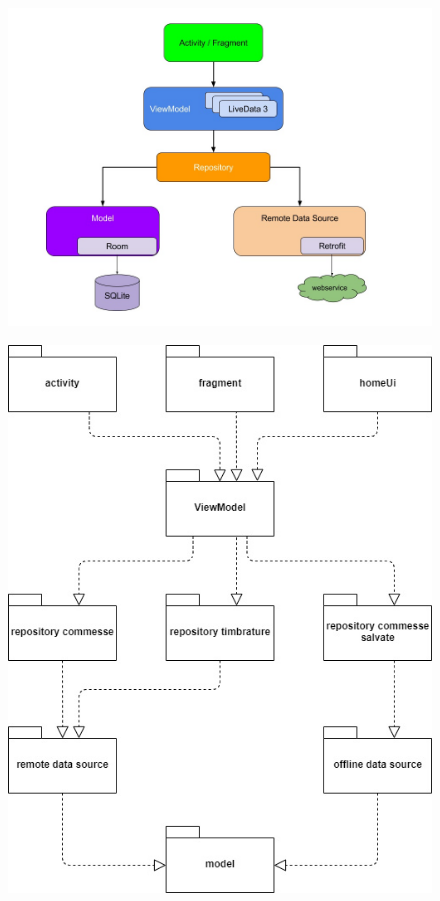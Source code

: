 \documentclass[12pt]{report}
\begin{document}
\begin{multicols}{2}
	\begin{figure}[H]
		\centering
		\includegraphics[width=1.1\linewidth]{immagini/final-architecture}
		\caption{}
		\label{}
	\end{figure}
	\begin{figure}[H]
		\centering
		\includegraphics[width=0.8\linewidth]{immagini/architecture}
		\caption{}
		\label{Modello realizzato per definire l'architettura finale}
	\end{figure}
\end{multicols}
\end{document}
